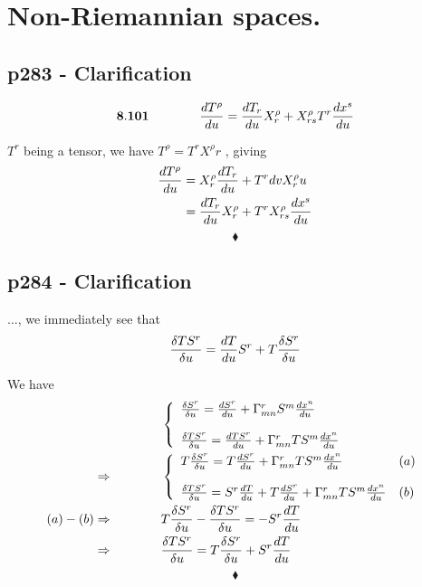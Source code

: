 \setcounter{chapter}{7}
\chapter{Non-Riemannian spaces.}
\pagebreak[4]
\section{p283 - Clarification}
\begin{tcolorbox}
$$\mathbf{8.101}\quad\quad\quad\quad \dv{T^{\rho}}{u} =\dv{T_r}{u}X^{\rho}_{r} + X^{\rho}_{rs}T^r \dv{x^s}{u}$$
\end{tcolorbox}
$T^r$ being a tensor, we have $ T^{\rho} = T^r X^{\rho}{r}$
, giving
\begin{align}
\dv{T^{\rho}}{u} &= X^{\rho}_{r}\dv{T_r}{u} + T^r dv{X^{\rho}_{r}}{u}\\
&= \dv{T_r}{u}X^{\rho}_{r} + T^r X^{\rho}_{rs}\dv{x^s}{u}
\end{align}
$$\blacklozenge$$
\newpage

\section{p284 - Clarification}
\begin{tcolorbox}
..., we immediately see that
$$\fdv{TS^r}{u} = \dv{T}{u} S^r + T \fdv{S^r}{u}$$
\end{tcolorbox}
We have 
\begin{align}
&\left\{\begin{array}{ll}
\fdv{S^r}{u} = \dv{S^r}{u} +\Gamma^r_{mn}S^m\dv{x^n}{u}& \ \\\\
\fdv{TS^r}{u} = \dv{TS^r}{u} +\Gamma^r_{mn}TS^m\dv{x^n}{u}& \ \\
\end{array}\right.\\
\Rightarrow \spatie &\left\{\begin{array}{ll}
T\fdv{S^r}{u} = T\dv{S^r}{u} +\Gamma^r_{mn}TS^m\dv{x^n}{u}&(a)\\\\
\fdv{TS^r}{u} = S^r\dv{T}{u} + T\dv{S^r}{u} +\Gamma^r_{mn}TS^m\dv{x^n}{u}&(b)\\
\end{array}\right.\\
(a)-(b)\Rightarrow\spatie & T \fdv{S^r}{u} - \fdv{TS^r}{u} =-  S^r\dv{T}{u} \\
\Rightarrow\spatie &\fdv{TS^r}{u} = T\fdv{S^r}{u}  +  S^r\dv{T}{u} 
\end{align}
$$\blacklozenge$$
\newpage

